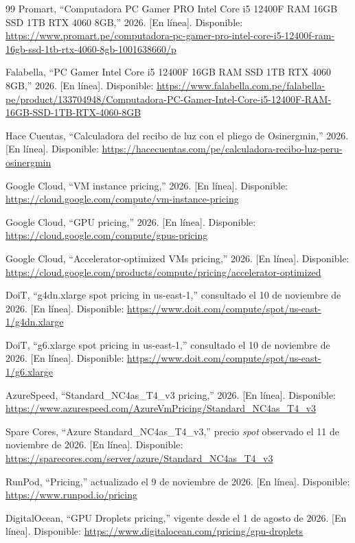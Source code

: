 \documentclass[12pt,a4paper]{article}
\begin{document}
\begin{thebibliography}{99}
Promart, ``Computadora PC Gamer PRO Intel Core i5 12400F RAM 16GB SSD 1TB RTX
4060 8GB,'' 2026. [En línea]. Disponible:
\url{https://www.promart.pe/computadora-pc-gamer-pro-intel-core-i5-12400f-ram-16gb-ssd-1tb-rtx-4060-8gb-1001638660/p}

Falabella, ``PC Gamer Intel Core i5 12400F 16GB RAM SSD 1TB RTX 4060 8GB,''
2026. [En línea]. Disponible:
\url{https://www.falabella.com.pe/falabella-pe/product/133704948/Computadora-PC-Gamer-Intel-Core-i5-12400F-RAM-16GB-SSD-1TB-RTX-4060-8GB}

Hace Cuentas, ``Calculadora del recibo de luz con el pliego de Osinergmin,''
2026. [En línea]. Disponible:
\url{https://hacecuentas.com/pe/calculadora-recibo-luz-peru-osinergmin}

Google Cloud, ``VM instance pricing,'' 2026. [En línea]. Disponible:
\url{https://cloud.google.com/compute/vm-instance-pricing}

Google Cloud, ``GPU pricing,'' 2026. [En línea]. Disponible:
\url{https://cloud.google.com/compute/gpus-pricing}

Google Cloud, ``Accelerator-optimized VMs pricing,'' 2026. [En línea].
Disponible: \url{https://cloud.google.com/products/compute/pricing/accelerator-optimized}

DoiT, ``g4dn.xlarge spot pricing in us-east-1,'' consultado el 10 de noviembre
de 2026. [En línea]. Disponible:
\url{https://www.doit.com/compute/spot/us-east-1/g4dn.xlarge}

DoiT, ``g6.xlarge spot pricing in us-east-1,'' consultado el 10 de noviembre
de 2026. [En línea]. Disponible:
\url{https://www.doit.com/compute/spot/us-east-1/g6.xlarge}

AzureSpeed, ``Standard\_NC4as\_T4\_v3 pricing,'' 2026. [En línea]. Disponible:
\url{https://www.azurespeed.com/AzureVmPricing/Standard_NC4as_T4_v3}

Spare Cores, ``Azure Standard\_NC4as\_T4\_v3,'' precio \textit{spot} observado el
11 de noviembre de 2026. [En línea]. Disponible:
\url{https://sparecores.com/server/azure/Standard_NC4as_T4_v3}

RunPod, ``Pricing,'' actualizado el 9 de noviembre de 2026. [En línea].
Disponible: \url{https://www.runpod.io/pricing}

DigitalOcean, ``GPU Droplets pricing,'' vigente desde el 1 de agosto de 2026.
[En línea]. Disponible: \url{https://www.digitalocean.com/pricing/gpu-droplets}


\end{thebibliography}
\end{document}
